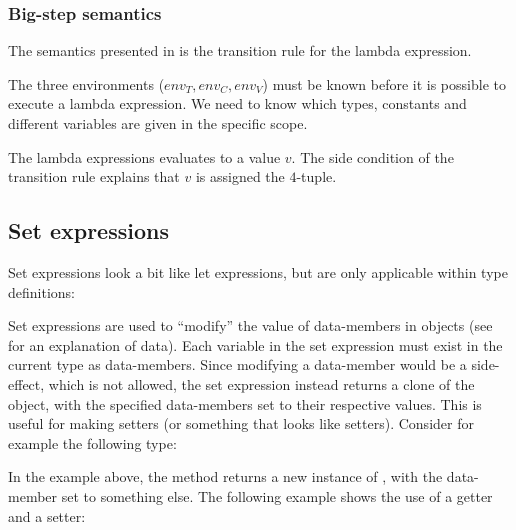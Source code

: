 \subsubsection{Big-step semantics}

The semantics presented in  is the transition rule for
the lambda expression. 



The three environments ($env_{T}, env_{C}, env_{V}$) must be known before it is
possible to execute a lambda expression. We need to know which types, constants
and different variables are given in the specific scope.

The lambda expressions evaluates to a value $v$. The side condition of the
transition rule explains that $v$ is assigned the $4$-tuple.

\subsection{Set expressions}
\label{sec:setexpressions}

Set expressions look a bit like let expressions, but are only applicable within
type definitions:

\begin{ebnf}
\end{ebnf}

Set expressions are used to ``modify'' the value of data-members in objects (see
 for an explanation of data). Each variable in the
set expression must exist in the current type as data-members. Since modifying a
data-member would be a side-effect, which is not allowed, the set expression
instead returns a clone of the object, with the specified data-members set to
their respective values. This is useful for making setters (or something that
looks like setters). Consider for example the following type:


In the example above, the method  returns a new instance of
, with the data-member  set to something else. The
following example shows the use of a getter and a setter:


